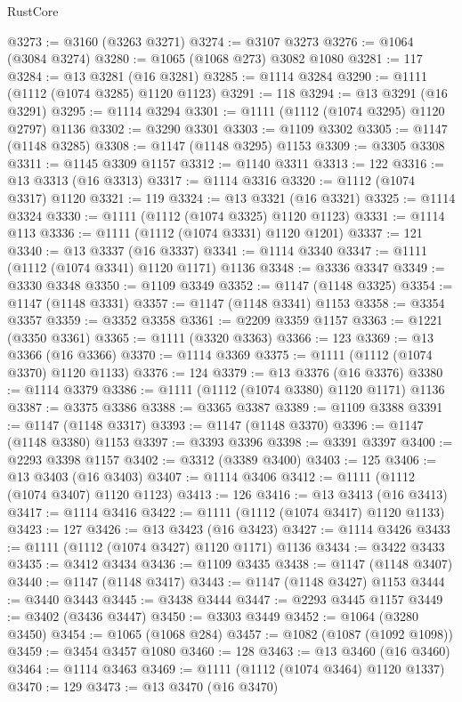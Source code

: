 \begin{lexlean}{RustCore}
\begin{coremodule}
@3273 := @3160 (@3263 @3271)
@3274 := @3107 @3273
@3276 := @1064 (@3084 @3274)
@3280 := @1065 (@1068 @273) @3082 @1080
@3281 := 117
@3284 := @13 @3281 (@16 @3281)
@3285 := @1114 @3284
@3290 := @1111 (@1112 (@1074 @3285) @1120 @1123)
@3291 := 118
@3294 := @13 @3291 (@16 @3291)
@3295 := @1114 @3294
@3301 := @1111 (@1112 (@1074 @3295) @1120 @2797) @1136
@3302 := @3290 @3301
@3303 := @1109 @3302
@3305 := @1147 (@1148 @3285)
@3308 := @1147 (@1148 @3295) @1153
@3309 := @3305 @3308
@3311 := @1145 @3309 @1157
@3312 := @1140 @3311
@3313 := 122
@3316 := @13 @3313 (@16 @3313)
@3317 := @1114 @3316
@3320 := @1112 (@1074 @3317) @1120
@3321 := 119
@3324 := @13 @3321 (@16 @3321)
@3325 := @1114 @3324
@3330 := @1111 (@1112 (@1074 @3325) @1120 @1123)
@3331 := @1114 @113
@3336 := @1111 (@1112 (@1074 @3331) @1120 @1201)
@3337 := 121
@3340 := @13 @3337 (@16 @3337)
@3341 := @1114 @3340
@3347 := @1111 (@1112 (@1074 @3341) @1120 @1171) @1136
@3348 := @3336 @3347
@3349 := @3330 @3348
@3350 := @1109 @3349
@3352 := @1147 (@1148 @3325)
@3354 := @1147 (@1148 @3331)
@3357 := @1147 (@1148 @3341) @1153
@3358 := @3354 @3357
@3359 := @3352 @3358
@3361 := @2209 @3359 @1157
@3363 := @1221 (@3350 @3361)
@3365 := @1111 (@3320 @3363)
@3366 := 123
@3369 := @13 @3366 (@16 @3366)
@3370 := @1114 @3369
@3375 := @1111 (@1112 (@1074 @3370) @1120 @1133)
@3376 := 124
@3379 := @13 @3376 (@16 @3376)
@3380 := @1114 @3379
@3386 := @1111 (@1112 (@1074 @3380) @1120 @1171) @1136
@3387 := @3375 @3386
@3388 := @3365 @3387
@3389 := @1109 @3388
@3391 := @1147 (@1148 @3317)
@3393 := @1147 (@1148 @3370)
@3396 := @1147 (@1148 @3380) @1153
@3397 := @3393 @3396
@3398 := @3391 @3397
@3400 := @2293 @3398 @1157
@3402 := @3312 (@3389 @3400)
@3403 := 125
@3406 := @13 @3403 (@16 @3403)
@3407 := @1114 @3406
@3412 := @1111 (@1112 (@1074 @3407) @1120 @1123)
@3413 := 126
@3416 := @13 @3413 (@16 @3413)
@3417 := @1114 @3416
@3422 := @1111 (@1112 (@1074 @3417) @1120 @1133)
@3423 := 127
@3426 := @13 @3423 (@16 @3423)
@3427 := @1114 @3426
@3433 := @1111 (@1112 (@1074 @3427) @1120 @1171) @1136
@3434 := @3422 @3433
@3435 := @3412 @3434
@3436 := @1109 @3435
@3438 := @1147 (@1148 @3407)
@3440 := @1147 (@1148 @3417)
@3443 := @1147 (@1148 @3427) @1153
@3444 := @3440 @3443
@3445 := @3438 @3444
@3447 := @2293 @3445 @1157
@3449 := @3402 (@3436 @3447)
@3450 := @3303 @3449
@3452 := @1064 (@3280 @3450)
@3454 := @1065 (@1068 @284)
@3457 := @1082 (@1087 (@1092 @1098))
@3459 := @3454 @3457 @1080
@3460 := 128
@3463 := @13 @3460 (@16 @3460)
@3464 := @1114 @3463
@3469 := @1111 (@1112 (@1074 @3464) @1120 @1337)
@3470 := 129
@3473 := @13 @3470 (@16 @3470)

\end{coremodule}
\end{lexlean}
